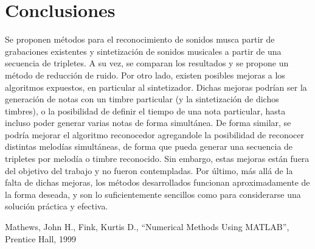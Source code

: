 \documentclass[journal, monochrome]{IEEEtran}
\begin{document}
\vspace{1cm}
\section{Conclusiones}
\label{section:conclusions}
\vspace{0.5cm}

Se proponen métodos para el reconocimiento de sonidos musca partir de grabaciones existentes y sintetización de sonidos musicales a partir de una secuencia de tripletes. A su vez, se comparan los resultados y se propone un método de reducción de ruido. Por otro lado, existen posibles mejoras a los algoritmos expuestos, en particular al sintetizador. Dichas mejoras podrían ser la generación de notas con un timbre particular (y la sintetización de dichos timbres), o la posibilidad de definir el tiempo de una nota particular, hasta incluso poder generar varias notas de forma simultánea. De forma similar, se podría mejorar el algoritmo reconocedor agregandole la posibilidad de reconocer distintas melodías simultáneas, de forma que pueda generar una secuencia de tripletes por melodía o timbre reconocido. Sin embargo, estas mejoras están fuera del objetivo del trabajo y no fueron contempladas. Por último, más allá de la falta de dichas mejoras, los métodos desarrollados funcionan aproximadamente de la forma deseada, y son lo suficientemente sencillos como para considerarse una solución práctica y efectiva.


\vspace{1cm}
\begin{thebibliography}{1}
	Mathews, John H.,
	Fink, Kurtis D.,
	``Numerical Methods Using MATLAB'',
	Prentice Hall,
	1999
	
\end{thebibliography}





\begin{figure}
	
\end{figure}
\begin{figure}
	
\end{figure}
\begin{figure}
	
\end{figure}
\begin{figure}
	
\end{figure}
\end{document}
